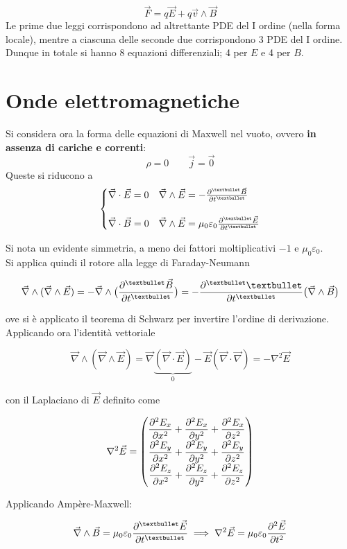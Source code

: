 \[\vec{F} = q \vec{E} + q \vec{v} \wedge \vec{B}\]
Le prime due leggi corrispondono ad altrettante PDE del I ordine (nella forma locale), mentre a ciascuna delle seconde due corrispondono 3 PDE del I ordine. Dunque in totale si hanno 8 equazioni differenziali; 4 per $E$ e 4 per $B$.


\section{Onde elettromagnetiche}

Si considera ora la forma delle equazioni di Maxwell nel vuoto, ovvero \textbf{in assenza di cariche e correnti}:
\[\rho = 0 \qquad \vec{j} = \vec{0}\]
Queste si riducono a
\[\begin{cases}
\vec{\nabla} \cdot \vec{E} = 0 & \vec{\nabla} \wedge \vec{E} = - \pdv[•]{\vec{B}}{t}\\
\\
\vec{\nabla} \cdot \vec{B} = 0 & \vec{\nabla} \wedge \vec{E} = \mu_0 \varepsilon_0 \pdv[•]{\vec{E}}{t}
\end{cases}\]

Si nota un evidente simmetria, a meno dei fattori moltiplicativi $-1$ e $\mu_0 \varepsilon_0$. 
\\Si applica quindi il rotore alla legge di Faraday-Neumann

\[\vec{\nabla} \wedge (\vec{\nabla} \wedge \vec{E}) = - \vec{\nabla} \wedge \big(\pdv[•]{\vec{B}}{t}\big) = - \pdv[•]{•}{t} \big(\vec{\nabla} \wedge \vec{B}\big)\]

ove si è applicato il teorema di Schwarz per invertire l'ordine di derivazione. Applicando ora l'identità vettoriale

\[\vec{\nabla} \wedge (\vec{\nabla} \wedge \vec{E}) = \vec{\nabla} \underbrace{(\vec{\nabla} \cdot \vec{E})}_{0} - \vec{E} (\vec{\nabla} \cdot \vec{\nabla}) = - \nabla^2 \vec{E}\]

con il Laplaciano di $\vec{E}$ definito come

\[\nabla^2 \vec{E} = \begin{pmatrix}
\displaystyle \pdv[2]{E_x}{x} + \pdv[2]{E_x}{y} + \pdv[2]{E_x}{z}\\
\displaystyle \pdv[2]{E_y}{x} + \pdv[2]{E_y}{y} + \pdv[2]{E_y}{z}\\
\displaystyle \pdv[2]{E_z}{x} + \pdv[2]{E_z}{y} + \pdv[2]{E_z}{z}
\end{pmatrix}\]

Applicando Ampère-Maxwell:

\[\vec{\nabla} \wedge \vec{B} = \mu_0 \varepsilon_0 \pdv[•]{\vec{E}}{t} \implies \nabla^2 \vec{E} = \mu_0 \varepsilon_0 \pdv[2]{\vec{E}}{t} \]

